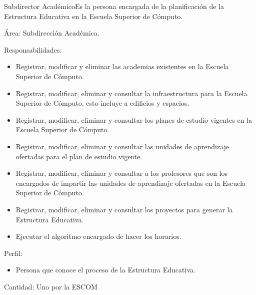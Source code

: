\begin{actor}{Subdirector Académico}{Es la persona encargada de la planificación de la Estructura Educativa en la Escuela Superior de Cómputo.}

	\item[Área:] Subdirección Académica.
	\item[Responsabilidades:] \hspace{1pt}
		\begin{itemize}
		    \item Registrar, modificar y eliminar las academias existentes en la Escuela Superior de Cómputo.
		    
		   	\item Registrar, modificar, eliminar y consultar la infraestructura para la Escuela Superior de Cómputo, esto incluye a edificios y espacios.
		   	
		   	\item Registrar, modificar, eliminar y consultar los planes de estudio vigentes en la Escuela Superior de Cómputo.
		   	
		   	\item Registrar, modificar, eliminar y consultar las unidades de aprendizaje ofertadas para el plan de estudio vigente. 
		   	
		   	\item Registrar, modificar, eliminar y consultar a los profesores que son los encargados de impartir las unidades de aprendizaje ofertadas en la Escuela Superior de Cómputo. 
		   	
			\item Registrar, modificar, eliminar y consultar los proyectos para generar la Estructura Educativa.
			
			\item Ejecutar el algoritmo encargado de hacer los horarios.
			
		 \end{itemize}
	\item[Perfil:] \hspace{1pt}
		\begin{itemize}
		    \item Persona que conoce el proceso de la Estructura Educativa.
	    \end{itemize}
	\item[Cantidad:] Uno por la ESCOM
\end{actor}


